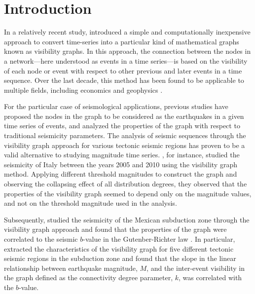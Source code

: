 
\section{Introduction}

In a relatively recent study, \citet{Lacasa2008} introduced a simple and computationally inexpensive approach to convert time-series into a particular kind of mathematical graphs known as visibility graphs. In this approach, the connection between the nodes in a network---here understood as events in a time series---is based on the visibility of each node or event with respect to other previous and later events in a time sequence. Over the last decade, this method has been found to be applicable to multiple fields, including economics and geophysics \citep[e.g.,][]{Telesca2012_CSF, Long2013, Wang2012}.

For the particular case of seismological applications, previous studies have proposed the nodes in the graph to be considered as the earthquakes in a given time series of events, and analyzed the properties of the graph with respect to traditional seismicity parameters. The analysis of seismic sequences through the visibility graph approach for various tectonic seismic regions has proven to be a valid alternative to studying magnitude time series. \citet{Telesca2012}, for instance, studied the seismicity of Italy between the years 2005 and 2010 using the visibility graph method. Applying different threshold magnitudes to construct the graph and observing the collapsing effect of all distribution degrees, they observed that the properties of the visibility graph seemed to depend only on the magnitude values, and not on the threshold magnitude used in the analysis. 

Subsequently, \citet{Telesca2013} studied the seismicity of the Mexican subduction zone through the visibility graph approach and found that the properties of the graph were correlated to the seismic $b$-value in the Gutenber-Richter law \citep{Gutenberg1944}. In particular, \citet{Telesca2013} extracted the characteristics of the visibility graph for five different tectonic seismic regions in the subduction zone and found that the slope in the linear relationship between earthquake magnitude, $M$, and the inter-event visibility in the graph defined as the connectivity degree parameter, $k$, was correlated with the $b$-value.

